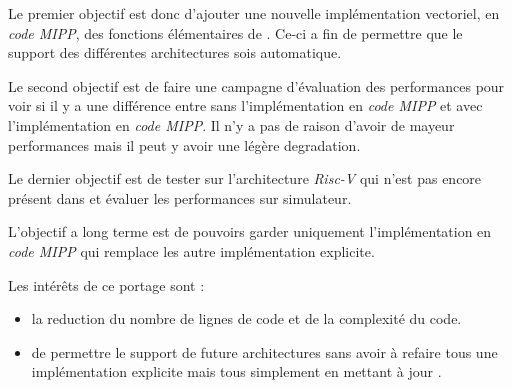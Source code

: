 Le premier objectif est donc d'ajouter une nouvelle implémentation vectoriel, en
\emph{code MIPP}, des fonctions élémentaires de \Eigen. Ce-ci a fin de permettre que le
support des différentes architectures sois automatique.

Le second objectif est de faire une campagne d'évaluation des performances pour voir si
il y a une différence entre \Eigen sans l'implémentation en \emph{code MIPP} et
\Eigen avec l'implémentation en \emph{code MIPP}. Il n'y a pas de raison d'avoir
de mayeur performances mais il peut y avoir une légère degradation.

Le dernier objectif est de tester \Eigen sur l'architecture \emph{Risc-V} qui n'est
pas encore présent dans \Eigen et évaluer les performances sur simulateur.

L'objectif a long terme est de pouvoirs garder uniquement l'implémentation en
\emph{code MIPP} qui remplace les autre implémentation explicite.

Les intérêts de ce portage sont :
\begin{itemize}
  \item la reduction du nombre de lignes de code et de la complexité du code.
  \item de permettre le support de future architectures sans avoir à refaire tous une
  implémentation explicite mais tous simplement en mettant à jour \MIPP.
\end{itemize}
